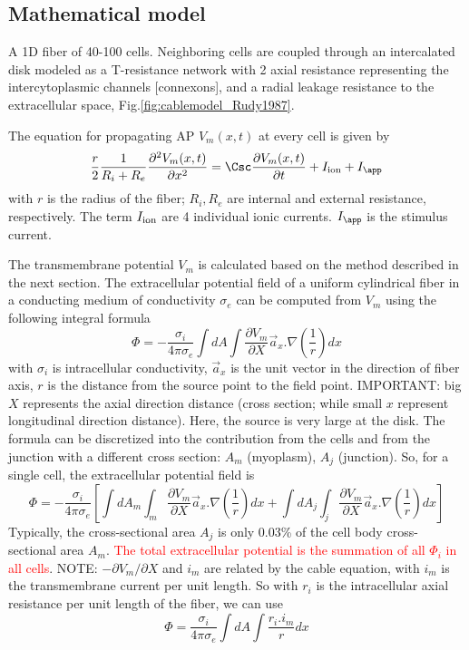 \subsection{Mathematical model}

A 1D fiber of 40-100 cells. Neighboring cells are coupled through an
intercalated disk modeled as a T-resistance network with 2 axial resistance
representing the intercytoplasmic channels [connexons], and a radial leakage
resistance to the extracellular space, Fig.\ref{fig:cablemodel_Rudy1987}. 

The equation for propagating AP $V_m(x,t)$ at every cell is given by
\begin{equation}
\frac{r}{2}\frac{1}{R_i+R_e}\frac{\partial^2 V_m(x,t)}{\partial x^2} = \Csc
\frac{\partial V_m(x,t)}{\partial t} + I_\ion + I_\app
\end{equation}
with $r$ is the radius of the fiber; $R_i, R_e$ are internal and external
resistance, respectively. The term $I_{\text{ion}}$ are 4 individual ionic
currents. $I_\app$ is the stimulus current.

The transmembrane potential $V_m$ is calculated based on the method described in
the next section. The extracellular potential field of a uniform cylindrical
fiber in a conducting medium of conductivity $\sigma_e$ can be computed from
$V_m$ using the following integral formula \citep{plonsey1977}
\begin{equation}
\label{eq:extracellular_potential-field}
\Phi = -\frac{\sigma_i}{4\pi \sigma_e} \int dA \int \frac{\partial
V_m}{\partial X} \vec{a}_x .\nabla\left(\frac{1}{r}\right) dx
\end{equation}
with $\sigma_i$ is intracellular conductivity, $\vec{a}_x$ is the unit vector
in the direction of fiber axis, $r$ is the distance from the source point to the
field point. IMPORTANT: big $X$ represents the axial direction distance (cross
section; while small $x$ represent longitudinal direction distance). Here, the
source is very large at the disk. The formula can be discretized into the
contribution from the cells and from the junction with a different cross
section: $A_m$ (myoplasm), $A_j$ (junction). So, for a single  cell, the
extracellular potential field is 
\begin{equation}
\Phi = -\frac{\sigma_i}{4\pi \sigma_e} \left[ \int dA_m \int_m \frac{\partial
V_m}{\partial X} \vec{a}_x .\nabla\left(\frac{1}{r}\right) dx
+ \int dA_j \int_j \frac{\partial
V_m}{\partial X} \vec{a}_x .\nabla\left(\frac{1}{r}\right) dx 
\right]
\end{equation}
Typically, the  cross-sectional area $A_j$ is only 0.03\% of the cell body
cross-sectional area $A_m$. \textcolor{red}{The total extracellular potential
is the summation of all $\Phi_i$ in all cells}.
NOTE: $-\partial V_m/\partial X$ and $i_m$ are related by the cable equation,
with $i_m$ is the transmembrane current per unit length. So with $r_i$ is the
intracellular axial resistance per unit length of the fiber, we can use
\begin{equation}
\Phi = \frac{\sigma_i}{4\pi \sigma_e}\int dA \int \frac{r_i.i_m}{r}dx
\end{equation}

